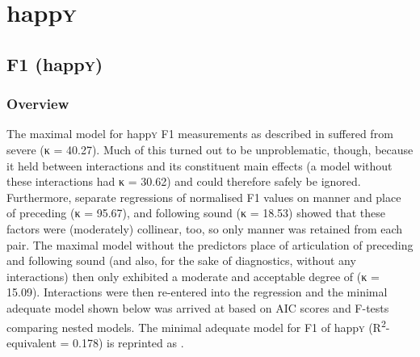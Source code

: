	\section{happ\textsc{y}}
	\label{sec.prod.res.vow.happy}	

		\subsection{F1 (happ\textsc{y})}
		\label{sec.prod.res.vow.happy.f1}
		
			\subsubsection{Overview}
			\label{sec.prod.res.vow.happy.f1.overview}

The maximal model for happ\textsc{y} F1 measurements as described in  suffered from severe  (κ = 40.27).
Much of this  turned out to be unproblematic, though, because it held between interactions and its constituent main effects (a model without these interactions had κ = 30.62) and could therefore safely be ignored.
Furthermore, separate regressions of normalised F1 values on manner and place of preceding (κ = 95.67), and following sound (κ = 18.53) showed that these factors were (moderately) collinear, too, so only manner was retained from each pair.
The maximal model without the predictors place of articulation of preceding and following sound (and also, for the sake of diagnostics, without any interactions) then only exhibited a moderate and acceptable degree of  (κ = 15.09).
Interactions were then re-entered into the regression and the minimal adequate model shown below was arrived at based on AIC scores and F-tests comparing nested models.
The minimal adequate model for F1 of happ\textsc{y} (R\textsuperscript{2}-equivalent = 0.178) is reprinted as .
		
